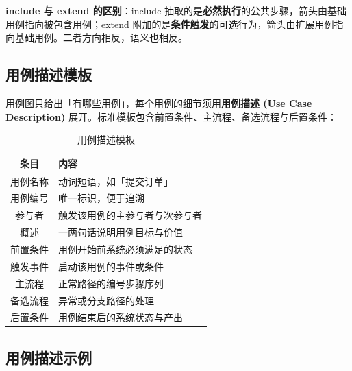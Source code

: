 \noindent\textbf{include 与 extend 的区别}：include 抽取的是\textbf{必然执行}的公共步骤，箭头由基础用例指向被包含用例；extend 附加的是\textbf{条件触发}的可选行为，箭头由扩展用例指向基础用例。二者方向相反，语义也相反。

\subsection{用例描述模板}

用例图只给出「有哪些用例」，每个用例的细节须用\textbf{用例描述 (Use Case Description)} 展开。标准模板包含前置条件、主流程、备选流程与后置条件：

\begin{table}[H]
\centering
\caption{用例描述模板}
\begin{tabulary}{\textwidth}{CL}
\toprule
条目 & 内容 \\
\midrule
用例名称 & 动词短语，如「提交订单」 \\
用例编号 & 唯一标识，便于追溯 \\
参与者 & 触发该用例的主参与者与次参与者 \\
概述 & 一两句话说明用例目标与价值 \\
前置条件 & 用例开始前系统必须满足的状态 \\
触发事件 & 启动该用例的事件或条件 \\
主流程 & 正常路径的编号步骤序列 \\
备选流程 & 异常或分支路径的处理 \\
后置条件 & 用例结束后的系统状态与产出 \\
\bottomrule
\end{tabulary}
\end{table}

\subsection{用例描述示例}

